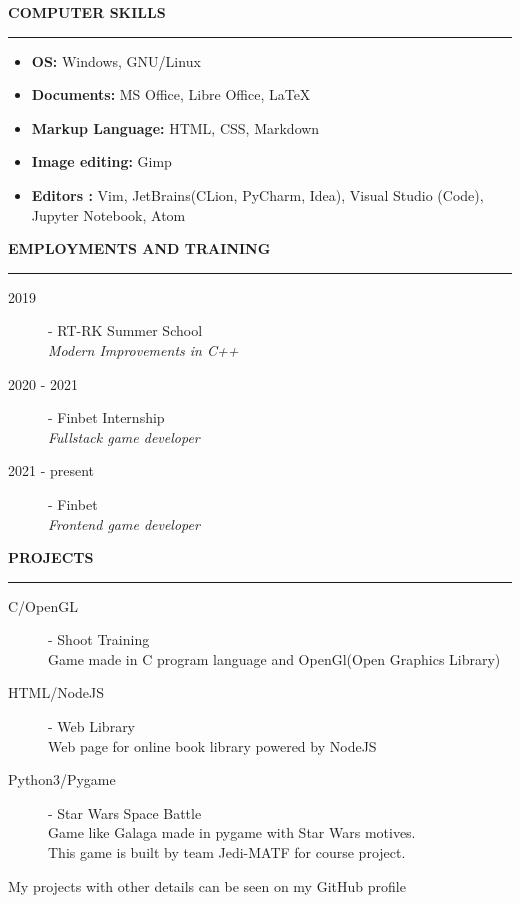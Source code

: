 \documentclass{article}
\begin{document}
\color{my_col}
\textbf{\large COMPUTER SKILLS}\\
\noindent\rule{15.4cm}{1.6pt}\color{black}
\normalsize
   \begin{multicols}{2}
  	\begin{itemize}
  		\item\textbf{OS: 	} Windows, GNU/Linux
  		\item\textbf{Documents:} MS Office, Libre Office, \LaTeX
  		\item\textbf{Markup Language: } HTML, CSS, Markdown\\
  		\item\textbf{Image editing: } Gimp
  		\item\textbf{Editors :} Vim, JetBrains(CLion, PyCharm, Idea),
  		Visual Studio (Code), Jupyter Notebook, Atom\\
 
  	\end{itemize}
  \end{multicols}

\color{my_col}
\textbf{\large EMPLOYMENTS AND TRAINING}\\
\noindent\rule{15.4cm}{1.6pt}\color{black}
\begin{description}
	\item[ 2019] - RT-RK Summer School \\
	\textit{Modern Improvements in C++}\\
	\item[ 2020 - 2021] - Finbet Internship \\
	\textit{Fullstack game developer}\\
	\item[ 2021 - present ] - Finbet \\
	\textit{Frontend game developer}\\
\end{description}

\color{my_col}
\textbf{\large PROJECTS}\\
\noindent\rule{15.4cm}{1.6pt}\color{black}
\begin{description}
	\item[ C/OpenGL] - Shoot Training\\ 
	Game made in C program language and OpenGl(Open Graphics Library)
	\item[ HTML/NodeJS] - Web Library\\ 
	Web page for online book library powered by NodeJS
	\item[ Python3/Pygame] - Star Wars Space Battle\\ 
	Game like Galaga made in pygame with Star Wars motives.\\
	This game is built by team Jedi-MATF for course project.
\end{description}
My projects with other details can be seen on my GitHub profile \\
\end{document}
